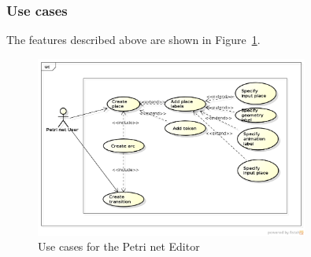 \subsubsection{Use cases}

The features described above are shown in Figure~\ref{fig:use-cases-petri-net-editor}.

\begin{figure}[htp]
\begin{center}
  \includegraphics[width=0.8\textwidth]{image/uc-petri-net.png}
  \caption{Use cases for the Petri net Editor}
  \label{fig:use-cases-petri-net-editor}
\end{center}
\end{figure}